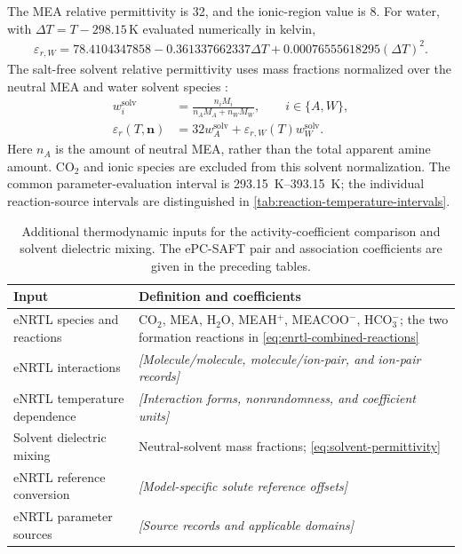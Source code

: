 The MEA relative permittivity is 32, and the ionic-region value is 8.
For water, with $\Delta T=T-298.15\,\mathrm K$ evaluated numerically in kelvin,
\begin{align}
\varepsilon_{r,W}=78.4104347858-0.361337662337\Delta T
+0.00076555618295(\Delta T)^2.
\end{align}
The salt-free solvent relative permittivity uses mass fractions normalized over the neutral MEA and water solvent species \cite{Figiel2025}:
\begin{align}
w_i^{\mathrm{solv}}&=\frac{n_iM_i}{n_A M_A+n_W M_W},\qquad i\in\{A,W\},\\
\varepsilon_r(T,\mathbf n)&=32w_A^{\mathrm{solv}}+\varepsilon_{r,W}(T)w_W^{\mathrm{solv}}.
\label{eq:solvent-permittivity}
\end{align}
Here $n_A$ is the amount of neutral MEA, rather than the total apparent amine amount.
CO$_2$ and ionic species are excluded from this solvent normalization.
The common parameter-evaluation interval is \qtyrange{293.15}{393.15}{K}; the individual reaction-source intervals are distinguished in \cref{tab:reaction-temperature-intervals}.

\begin{table}[pos=htbp]
\centering\small
\caption{Additional thermodynamic inputs for the activity-coefficient comparison and solvent dielectric mixing. The ePC-SAFT pair and association coefficients are given in the preceding tables.}
\label{tab:comparison-thermo-inputs}
\begin{tabularx}{\linewidth}{@{}lX@{}}
\toprule
Input & Definition and coefficients\\
\midrule
eNRTL species and reactions & CO$_2$, MEA, H$_2$O, MEAH$^+$, MEACOO$^-$, HCO$_3^-$; the two formation reactions in \cref{eq:enrtl-combined-reactions}\\
eNRTL interactions & \textit{[Molecule/molecule, molecule/ion-pair, and ion-pair records]}\\
eNRTL temperature dependence & \textit{[Interaction forms, nonrandomness, and coefficient units]}\\
Solvent dielectric mixing & Neutral-solvent mass fractions; \cref{eq:solvent-permittivity}\\
eNRTL reference conversion & \textit{[Model-specific solute reference offsets]}\\
eNRTL parameter sources & \textit{[Source records and applicable domains]}\\
\bottomrule
\end{tabularx}
\end{table}

